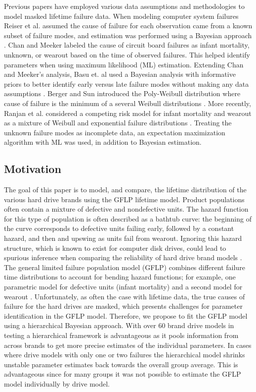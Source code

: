 \documentclass[12pt]{article}
\begin{document}
Previous papers have employed various data assumptions and methodologies to model masked lifetime failure data.  When modeling computer system failures Reiser et al. assumed the cause of failure for each observation came from a known subset of failure modes, and estimation was performed using a Bayesian approach \cite{reiser}.  Chan and Meeker labeled the cause of circuit board failures as infant mortality, unknown, or wearout based on the time of observed failures.  This helped identify parameters when using maximum likelihood (ML) estimation.  Extending Chan and Meeker's analysis, Basu et. al used a Bayesian analysis with informative priors to better identify early versus late failure modes without making any data assumptions \cite{basu}.  Berger and Sun introduced the Poly-Weibull distribution where cause of failure is the minimum of a several Weibull distributions \cite{berger}.  More recently, Ranjan et al. considered a competing risk model for infant mortality and wearout as a mixture of Weibull and exponential failure distributions \cite{ranjan}.  Treating the unknown failure modes as incomplete data, an expectation maximization algorithm with ML was used, in addition to Bayesian estimation.

\subsection{Motivation}
The goal of this paper is to model, and compare, the lifetime distribution of the various hard drive brands using the GFLP lifetime model.  Product populations often contain a mixture of defective and nondefective units.  The hazard function for this type of population is often described as a bathtub curve: the beginning of the curve corresponds to defective units failing early, followed by a constant hazard, and then and upswing as units fail from wearout.  Ignoring this hazard structure, which is known to exist for computer disk drives, could lead to spurious inference when comparing the reliability of hard drive brand models \cite{chan}.  The general limited failure population model (GFLP) combines different failure time distributions to account for bending hazard functions; for example, one parametric model for defective units (infant mortality) and a second model for wearout \cite{chan}.  Unfortunately, as often the case with lifetime data, the true causes of failure for the hard drives are masked, which presents challenges for parameter identification in the GFLP model.  Therefore, we propose to fit the GFLP model using a hierarchical Bayesian approach.  With over 60 brand drive models in testing a hierarchical framework is advantageous as it pools information from across brands to get more precise estimates of the individual parameters.  In cases where drive models with only one or two failures the hierarchical model shrinks unstable parameter estimates back towards the overall group average.  This is advantageous since for many groups it was not possible to estimate the GFLP model individually by drive model. 
\end{document}
